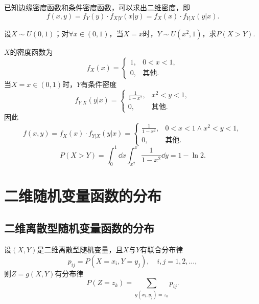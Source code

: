 \begin{corollary}
已知边缘密度函数和条件密度函数，可以求出二维密度，即\[
f(x,y) = f_Y(y) \cdot f_{X \vert Y}(x \vert y)
= f_X(x) \cdot f_{Y \vert X}(y \vert x).
\]
\end{corollary}

\begin{example}
设\(X \sim U(0,1)\)；对\(\forall x\in(0,1)\)，当\(X=x\)时，\(Y \sim U(x^2,1)\)，求\(P(X > Y)\).
\begin{solution}
\(X\)的密度函数为\[
f_X(x) = \left\{ \begin{array}{cl}
1, & 0<x<1, \\
0, & \text{其他}.
\end{array} \right.
\]当\(X=x\in(0,1)\)时，\(Y\)有条件密度\[
f_{Y \vert X}(y \vert x)
= \left\{ \begin{array}{cl}
\frac{1}{1-x^2}, & x^2<y<1, \\
0, & \text{其他}.
\end{array} \right.
\]因此\[
f(x,y) = f_X(x) \cdot f_{Y \vert X}(y \vert x)
= \left\{ \begin{array}{cl}
\frac{1}{1-x^2}, & 0<x<1 \land x^2<y<1, \\
0, & \text{其他}.
\end{array} \right.
\]\[
P(X > Y)
= \int_0^1 \dd{x} \int_{x^2}^x \frac{1}{1-x^2} \dd{y}
= 1 - \ln2.
\]
\end{solution}
\end{example}

\section{二维随机变量函数的分布}
\subsection{二维离散型随机变量函数的分布}
设\((X,Y)\)是二维离散型随机变量，且\(X\)与\(Y\)有联合分布律\[
p_{ij} = P(X=x_i,Y=y_j), \quad i,j=1,2,\dotsc,
\]则\(Z = g(X,Y)\)有分布律\[
P(Z=z_k) = \sum_{g(x_i,y_j)=z_k}{p_{ij}}.
\]

